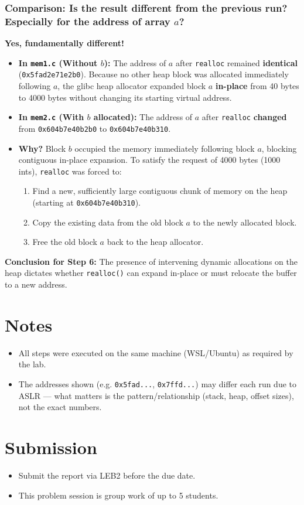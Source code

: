 \documentclass[12pt,a4paper]{article}
\begin{document}
\subsubsection*{Comparison: Is the result different from the previous run? Especially for the address of array $a$?}
\textbf{Yes, fundamentally different!}
\begin{itemize}
    \item \textbf{In \texttt{mem1.c} (Without $b$):} 
    The address of $a$ after \texttt{realloc} remained \textbf{identical} (\texttt{0x5fad2e71e2b0}). Because no other heap block was allocated immediately following $a$, the glibc heap allocator expanded block $a$ \textbf{in-place} from 40 bytes to 4000 bytes without changing its starting virtual address.
    \item \textbf{In \texttt{mem2.c} (With $b$ allocated):} 
    The address of $a$ after \texttt{realloc} \textbf{changed} from \texttt{0x604b7e40b2b0} to \texttt{0x604b7e40b310}. 
    \item \textbf{Why?} Block $b$ occupied the memory immediately following block $a$, blocking contiguous in-place expansion. To satisfy the request of 4000 bytes (1000 ints), \texttt{realloc} was forced to:
    \begin{enumerate}
        \item Find a new, sufficiently large contiguous chunk of memory on the heap (starting at \texttt{0x604b7e40b310}).
        \item Copy the existing data from the old block $a$ to the newly allocated block.
        \item Free the old block $a$ back to the heap allocator.
    \end{enumerate}
\end{itemize}

\textbf{Conclusion for Step 6:} The presence of intervening dynamic allocations on the heap dictates whether \texttt{realloc()} can expand in-place or must relocate the buffer to a new address.

\newpage
\section*{Notes}
\begin{itemize}
    \item All steps were executed on the same machine (WSL/Ubuntu) as required by the lab.
    \item The addresses shown (e.g. \verb|0x5fad...|, \verb|0x7ffd...|) may differ each run due to ASLR --- what matters is the pattern/relationship (stack, heap, offset sizes), not the exact numbers.
\end{itemize}

\section*{Submission}
\begin{itemize}
    \item Submit the report via LEB2 before the due date.
    \item This problem session is group work of up to 5 students.
\end{itemize}
\end{document}

